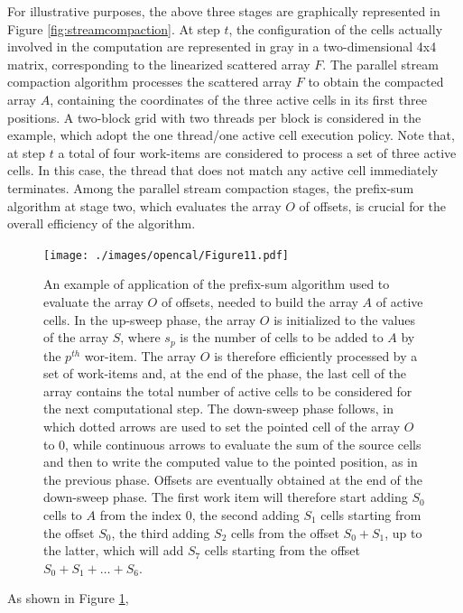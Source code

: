 For illustrative purposes, the above three stages are graphically
represented in Figure \ref{fig:streamcompaction}. At step $t$, the
configuration of the cells actually involved in the computation are
represented in gray in a two-dimensional 4x4 matrix, corresponding
to the linearized scattered array $F$. The parallel stream
compaction algorithm processes the scattered array $F$ to obtain the
compacted array $A$, containing the coordinates of the three active
cells in its first three positions. A two-block grid with two
threads per block is considered in the example, which adopt the one
thread/one active cell execution policy. Note that, at step $t$ a
total of four work-items are considered to process a set of three
active cells. In this case, the thread that does not match any
active cell immediately terminates. Among the parallel stream
compaction stages, the prefix-sum algorithm at stage two, which
evaluates the array $O$ of offsets, is crucial for the overall
efficiency of the algorithm. 
\begin{figure}
	\begin{center}
		\texttt{[image: ./images/opencal/Figure11.pdf]}
		\caption[An example of application of the prefix-sum algorithm used to build the array of \textit{active cells}.]{An example of application of the prefix-sum algorithm used to evaluate the array $O$ of offsets, needed to build the array $A$ of active cells. In the up-sweep phase, the array $O$ is initialized to the
		values of the array $S$, where $s_p$ is the number of cells to be
		added to $A$ by the $p^{th}$ wor-item. The array $O$ is therefore
		efficiently processed by a set of work-items and, at the end of the
		phase, the last cell of the array contains the total number of active cells to be considered for the next computational step. The down-sweep phase follows, in which dotted arrows are used to set the pointed cell of the array $O$ to $0$, while continuous arrows to evaluate the sum of the source cells and then to write the computed value to the pointed position, as in the previous phase. Offsets are eventually obtained at the end of the down-sweep phase. The first work item will therefore start adding $S_0$ cells to $A$ from the index $0$, the second adding $S_1$ cells starting from the offset $S_0$, the third adding $S_2$ cells from the offset $S_0+S_1$, up to the latter, which will add $S_7$ cells starting from the offset $S_0+S_1+\ldots+S_6$.}
		\label{fig:prefixsum}
	\end{center}
\end{figure}
As shown in Figure \ref{fig:prefixsum},
